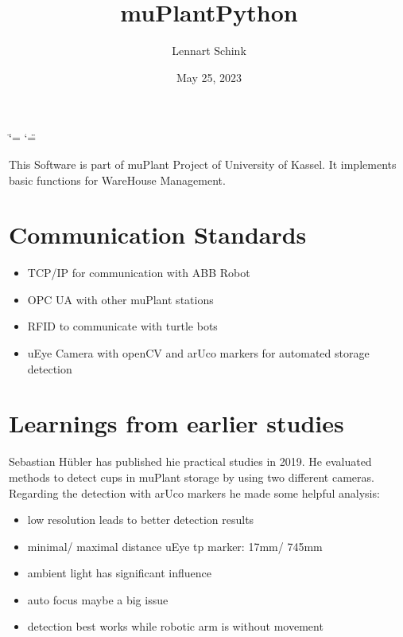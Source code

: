 \documentclass[letterpaper,10pt,english]{sphinxmanual}
\title{muPlantPython}
\date{May 25, 2023}
\author{Lennart Schink}
\begin{document}
\ifdefined\shorthandoff
  \ifnum\catcode`\=\string=\active\shorthandoff{=}\fi
  \ifnum\catcode`\"=\active{}\fi
\fi

\pagestyle{empty}
\sphinxmaketitle
\pagestyle{plain}
\sphinxtableofcontents
\pagestyle{normal}
\label{\detokenize{index::doc}}


\sphinxAtStartPar
This Software is part of muPlant Project of University of Kassel.
It implements basic functions for WareHouse Management.


\chapter{Communication Standards}
\label{\detokenize{index:communication-standards}}\begin{itemize}
\item {} 
\sphinxAtStartPar
TCP/IP for communication with ABB Robot

\item {} 
\sphinxAtStartPar
OPC UA with other muPlant stations

\item {} 
\sphinxAtStartPar
RFID to communicate with turtle bots

\item {} 
\sphinxAtStartPar
uEye Camera with openCV and arUco markers for automated storage detection

\end{itemize}


\chapter{Learnings from earlier studies}
\label{\detokenize{index:learnings-from-earlier-studies}}
\sphinxAtStartPar
Sebastian Hübler has published hie practical studies in 2019. He evaluated methods to detect cups
in muPlant storage by using two different cameras.
Regarding the detection with arUco markers he made some helpful analysis:
\begin{itemize}
\item {} 
\sphinxAtStartPar
low resolution leads to better detection results

\item {} 
\sphinxAtStartPar
minimal/ maximal distance uEye tp marker: 17mm/ 745mm

\item {} 
\sphinxAtStartPar
ambient light has significant influence

\item {} 
\sphinxAtStartPar
auto focus maybe a big issue

\item {} 
\sphinxAtStartPar
detection best works while robotic arm is without movement

\end{itemize}
\end{document}
